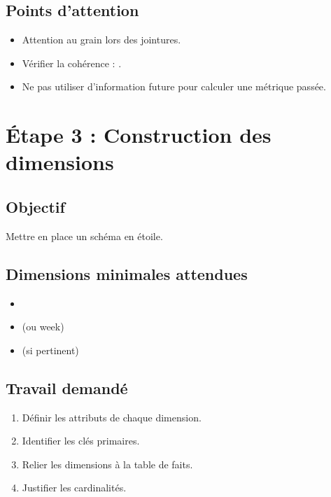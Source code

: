 \documentclass[11pt,a4paper]{article}
\begin{document}
\subsection*{Points d’attention}

\begin{itemize}
  \item Attention au grain lors des jointures.
  \item Vérifier la cohérence : 
  .
  \item Ne pas utiliser d’information future pour calculer une métrique passée.
\end{itemize}


\section{Étape 3 : Construction des dimensions}

\subsection*{Objectif}

Mettre en place un schéma en étoile.

\subsection*{Dimensions minimales attendues}

\begin{itemize}
  \item {}
  \item {} (ou week)
  \item {} (si pertinent)
\end{itemize}

\subsection*{Travail demandé}

\begin{enumerate}
  \item Définir les attributs de chaque dimension.
  \item Identifier les clés primaires.
  \item Relier les dimensions à la table de faits.
  \item Justifier les cardinalités.
\end{enumerate}
\end{document}
